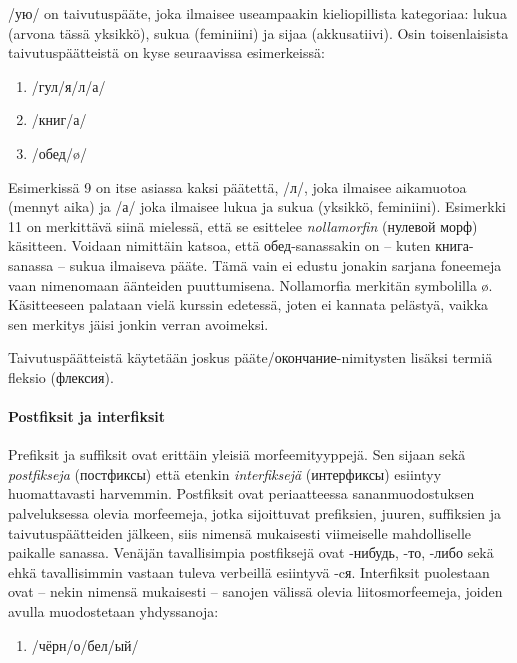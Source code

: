 \documentclass[]{scrartcl}
\begin{document}
/ую/ on taivutuspääte, joka ilmaisee useampaakin kieliopillista
kategoriaa: lukua (arvona tässä yksikkö), sukua (feminiini) ja sijaa
(akkusatiivi). Osin toisenlaisista taivutuspäätteistä on kyse
seuraavissa esimerkeissä:

\begin{enumerate}
\def\labelenumi{(\arabic{enumi})}
\setcounter{enumi}{8}
\itemsep1pt\parskip0pt
\item
  /гул/я/л/а/
\item
  /книг/а/
\item
  /обед/ø/
\end{enumerate}

Esimerkissä 9 on itse asiassa kaksi päätettä, /л/, joka ilmaisee
aikamuotoa (mennyt aika) ja /а/ joka ilmaisee lukua ja sukua (yksikkö,
feminiini). Esimerkki 11 on merkittävä siinä mielessä, että se esittelee
\emph{nollamorfin} (нулевой морф) käsitteen. Voidaan nimittäin katsoa,
että обед-sanassakin on -- kuten книга-sanassa -- sukua ilmaiseva pääte.
Tämä vain ei edustu jonakin sarjana foneemeja vaan nimenomaan äänteiden
puuttumisena. Nollamorfia merkitän symbolilla ø. Käsitteeseen palataan
vielä kurssin edetessä, joten ei kannata pelästyä, vaikka sen merkitys
jäisi jonkin verran avoimeksi.

Taivutuspäätteistä käytetään joskus pääte/окончание-nimitysten lisäksi
termiä fleksio (флексия).

\paragraph{Postfiksit ja interfiksit}\label{postfiksit-ja-interfiksit}

Prefiksit ja suffiksit ovat erittäin yleisiä morfeemityyppejä. Sen
sijaan sekä \emph{postfikseja} (постфиксы) että etenkin
\emph{interfiksejä} (интерфиксы) esiintyy huomattavasti harvemmin.
Postfiksit ovat periaatteessa sananmuodostuksen palveluksessa olevia
morfeemeja, jotka sijoittuvat prefiksien, juuren, suffiksien ja
taivutuspäätteiden jälkeen, siis nimensä mukaisesti viimeiselle
mahdolliselle paikalle sanassa. Venäjän tavallisimpia postfiksejä ovat
-нибудь, -то, -либо sekä ehkä tavallisimmin vastaan tuleva verbeillä
esiintyvä -cя. Interfiksit puolestaan ovat -- nekin nimensä mukaisesti
-- sanojen välissä olevia liitosmorfeemeja, joiden avulla muodostetaan
yhdyssanoja:

\begin{enumerate}
\def\labelenumi{(\arabic{enumi})}
\setcounter{enumi}{11}
\itemsep1pt\parskip0pt
\item
  /чёрн/о/бел/ый/
\end{enumerate}
\end{document}
